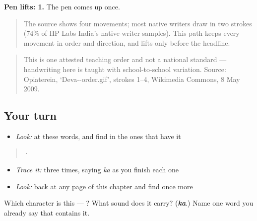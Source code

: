\textbf{Pen lifts: 1.} The pen comes up once.

\begin{quote}
The source shows four movements; most native writers draw  in two strokes (74\% of HP Labs India's native-writer samples). This path keeps every movement in order and direction, and lifts only before the headline.
\end{quote}

\begin{quote}
This is one attested teaching order and not a national standard — handwriting here is taught with school-to-school variation. Source: Opiaterein, ‘Deva--order.gif’, strokes 1–4, Wikimedia Commons, 8 May 2009.
\end{quote}

\subsection*{Your turn}
\begin{itemize}
\raggedright
  \item \emph{Look:} at these words, and find  in the ones that have it
\end{itemize}

\begin{quote}
  ·  
\end{quote}

\begin{itemize}
\raggedright
  \item \emph{Trace it:}  three times, saying \emph{ka} as you finish each one
  \item \emph{Look:} back at any page of this chapter and find  once more
\end{itemize}

\begin{tcolorbox}[breakable,colback=teal!4,colframe=teal!35!black,title={Before you move on}]
Which character is this — ? What sound does it carry? (\emph{\textbf{ka}}.) Name one word you already say that contains it.
\end{tcolorbox}
